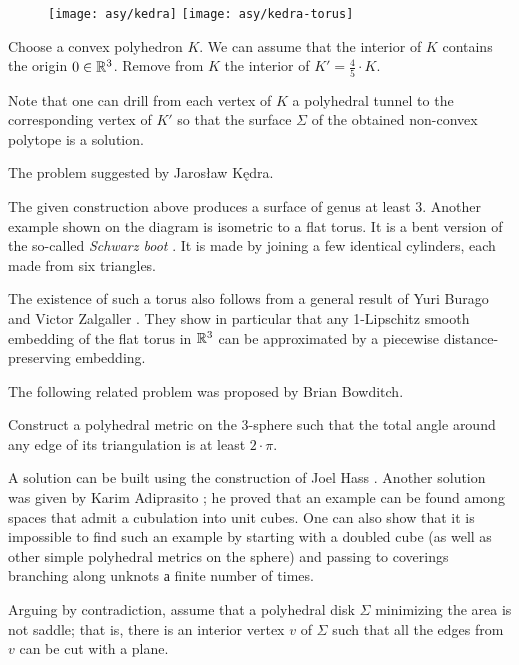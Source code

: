 {

\begin{wrapfigure}{r}{43 mm}
\vskip-2mm
\centering
\texttt{[image: asy/kedra]}
\bigskip
\texttt{[image: asy/kedra-torus]}
\end{wrapfigure}

\medskip

Choose a convex polyhedron $K$.
We can assume that the interior of $K$ contains the origin $0\in\mathbb{R}^3$.
Remove from $K$ the interior of $K'=\tfrac45\cdot K$.

Note that one can drill from each vertex of $K$ a polyhedral tunnel to the corresponding vertex of $K'$
so that the surface $\Sigma$ of the obtained non-convex polytope is a solution.
\qeds

The problem suggested by Jaros{\l}aw K\k{e}dra.

The given construction above produces a surface of genus at least 3.
Another example shown on the diagram is isometric to a flat torus.
It is a bent version of the so-called \emph{Schwarz boot} \cite{schwarz1890definition}.
It is made by joining a few identical cylinders, each made from six triangles.

The existence of such a torus also follows from a general result of Yuri Burago and Victor Zalgaller \cite{burago-zalgaller:pl}.
They show in particular that any 1-Lipschitz smooth embedding of the flat torus in $\mathbb{R}^3$ can be approximated by a piecewise distance-preserving embedding.

}


The following related problem was proposed by Brian Bowditch.

\begin{pr}
Construct a polyhedral metric on the 3-sphere such that the total angle around any edge of its triangulation is at least $2\cdot\pi$.
\end{pr}

A solution can be built using the construction of Joel Hass \cite{hass}.
Another solution was given by Karim Adiprasito \cite{adiprasito};
he proved that an example can be found among spaces that admit a cubulation into unit cubes.
One can also show that it is impossible to find such an example by starting with a doubled cube (as well as other simple polyhedral metrics on the sphere) and passing to coverings branching along unknots а finite number of times.


Arguing by contradiction, 
assume that a polyhedral disk $\Sigma$ minimizing the area is not saddle;
that is, there is an interior vertex $v$ of $\Sigma$ such that all the edges from $v$ can be cut with a plane.

